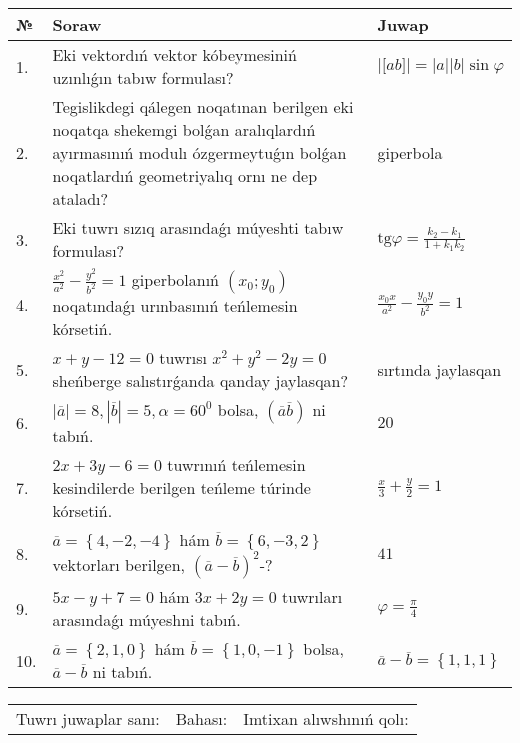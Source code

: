 \documentclass{article}
\begin{document}
\begin{tabular}{|m{0.7cm}|m{10cm}|m{4cm}|}
\hline
№ & Soraw & Juwap \\
\hline
1. & Eki vektordıń vektor kóbeymesiniń uzınlıǵın tabıw formulası? & $\left| \lbrack ab\rbrack \right|=|a||b|\sin\varphi$ \\
\hline
2. & Tegislikdegi qálegen noqatınan berilgen eki noqatqa shekemgi bolǵan aralıqlardıń ayırmasınıń modulı ózgermeytuǵın bolǵan noqatlardıń geometriyalıq ornı ne dep ataladı? & giperbola \\
\hline
3. & Eki tuwrı sızıq arasındaǵı múyeshti tabıw formulası? & $\text{tg}\varphi=\frac{k_2-k_1}{1+k_1k_2}$ \\
\hline
4. & $\frac{x^2}{a^2}-\frac{y^2}{b^2}=1$ giperbolanıń $(x_0;y_0)$ noqatındaǵı urınbasınıń teńlemesin kórsetiń. & $\frac{x_0x}{a^2}-\frac{y_0y}{b^2}=1$ \\
\hline
5. & $x+y-12=0$ tuwrısı $x^{2}+y^{2}-2y=0$ sheńberge salıstırǵanda qanday jaylasqan? & sırtında jaylasqan \\
\hline
6. & $\left| \overline{a} \right|=8, \left| \overline{b} \right|=5, \alpha=60^{0}$ bolsa, $( \overline{a}\overline{b} )$ ni tabıń. & $20$ \\
\hline
7. & $2x+3y-6=0$ tuwrınıń teńlemesin kesindilerde berilgen teńleme túrinde kórsetiń. & $\frac{x}{3} + \frac{ y }{ 2 } =  1$ \\
\hline
8. & $\overline{a}=\left\{ 4,-2,-4 \right\}$ hám $\overline{b}=\left\{ 6,-3, 2 \right\}$ vektorları berilgen, $(\overline{a}-\overline{b}) ^{2}$-? & $41$ \\
\hline
9. & $5x-y+7=0$ hám $3x+2y=0$ tuwrıları arasındaǵı múyeshni tabıń. & $\varphi=\frac{\pi}{4}$ \\
\hline
10. & $\overline{a}=\left\{ 2, 1, 0 \right\}$ hám $\overline{b}=\left\{ 1, 0,-1 \right\}$ bolsa, $\overline{a}-\overline{b}$ ni tabıń. & $\overline{a} -\overline{b} = \left\{ 1,1,1 \right\}$ \\
\hline
\end{tabular}

\vspace{1cm}

\begin{tabular}{lll}
Tuwrı juwaplar sanı: \underline{\hspace{1.5cm}} & 
Bahası: \underline{\hspace{1.5cm}} & 
Imtixan alıwshınıń qolı: \underline{\hspace{2cm}} \\
\end{tabular}
\end{document}
